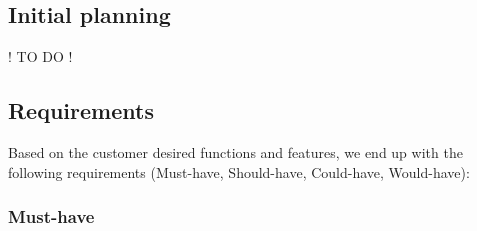 \subsection{Initial planning}

! TO DO !

\subsection{Requirements}
Based on the customer desired functions and features, we end up with the following requirements (Must-have, Should-have, Could-have, Would-have):

\subsubsection{Must-have}

